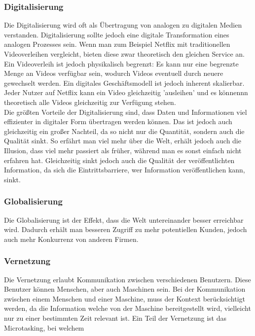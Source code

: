 \documentclass{article}
\begin{document}
		\subsubsection{Digitalisierung}
		Die Digitalisierung wird oft als Übertragung von analogen zu digitalen Medien verstanden. Digitalisierung sollte jedoch eine digitale Transformation eines analogen Prozesses sein. Wenn man zum Beispiel Netflix mit traditionellen Videoverleihen vergleicht, bieten diese zwar theoretisch den gleichen Service an. Ein Videoverleih ist jedoch physikalisch begrenzt: Es kann nur eine begrenzte Menge an Videos verfügbar sein, wodurch Videos eventuell durch neuere gewechselt werden. Ein digitales Geschäftsmodell ist jedoch inherent skalierbar. Jeder Nutzer auf Netflix kann ein Video gleichzeitig 'ausleihen' und es könnennn theoretisch alle Videos gleichzeitig zur Verfügung stehen. \\
		Die größten Vorteile der Digitalisierung sind, dass Daten und Informationen viel effizienter in digitaler Form übertragen werden können. Das ist jedoch auch gleichzeitig ein großer Nachteil, da so nicht nur die Quantität, sondern auch die Qualität sinkt. So erfährt man viel mehr über die Welt, erhält jedoch auch die Illusion, dass viel mehr passiert als früher, während man es sonst einfach nicht erfahren hat. Gleichzeitig sinkt jedoch auch die Qualität der veröffentlichten Information, da sich die Eintrittsbarriere, wer Information veröffentlichen kann, sinkt. \\
		\subsubsection{Globalisierung}
		Die Globalisierung ist der Effekt, dass die Welt untereinander besser erreichbar wird. Dadurch erhält man besseren Zugriff zu mehr potentiellen Kunden, jedoch auch mehr Konkurrenz von anderen Firmen. 
		\subsubsection{Vernetzung}
		Die Vernetzung erlaubt Kommunikation zwischen verschiedenen Benutzern. Diese Benutzer können Menschen, aber auch Maschinen sein. Bei der Kommunikation zwischen einem Menschen und einer Maschine, muss der Kontext berücksichtigt werden, da die Information welche von der Maschine bereitgestellt wird, vielleicht nur zu einer bestimmten Zeit relevant ist. Ein Teil der Vernetzung ist das Microtasking, bei welchem
\end{document}
